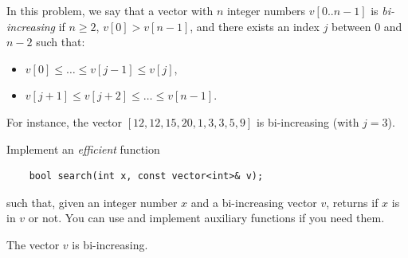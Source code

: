 

\Statement

In this problem,
we say that a vector with $n$ integer numbers $v[0..n-1]$
is \emph{bi-increasing}
if $n \ge 2$,
$v[0] > v[n-1]$,
and there exists an index $j$ between $0$ and $n-2$ such that:
\begin{itemize}
\item $v[0] \le \ldots \le v[j-1] \le v[j]$,
\item $v[j+1] \le v[j+2] \le \ldots \le v[n-1]$.
\end{itemize}

\smallskip

For instance, the vector
$[12, 12, 15, 20, 1, 3, 3, 5, 9]$
is bi-increasing (with $j = 3$).

\bigskip

Implement an \emph{efficient} function

\begin{lstlisting}
    bool search(int x, const vector<int>& v);
\end{lstlisting}

such that, given an integer number $x$ and a bi-increasing vector $v$,
returns if $x$ is in $v$ or not.
You can use and implement auxiliary functions if you need them.


\Precondition

The vector $v$ is bi-increasing.


\ObservationNoMain

